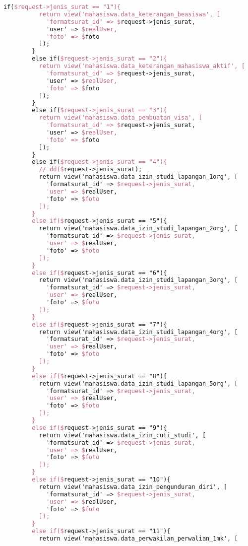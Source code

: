\begin{lstlisting}[language=tex,basicstyle=\tiny,caption=FormatsuratController.php]
        if($request->jenis_surat == "1"){
          return view('mahasiswa.data_keterangan_beasiswa', [
            'formatsurat_id' => $request->jenis_surat,
            'user' => $realUser,
            'foto' => $foto
          ]);
        }
        else if($request->jenis_surat == "2"){
          return view('mahasiswa.data_keterangan_mahasiswa_aktif', [
            'formatsurat_id' => $request->jenis_surat,
            'user' => $realUser,
            'foto' => $foto
          ]);
        }
        else if($request->jenis_surat == "3"){
          return view('mahasiswa.data_pembuatan_visa', [
            'formatsurat_id' => $request->jenis_surat,
            'user' => $realUser,
            'foto' => $foto
          ]);
        }
        else if($request->jenis_surat == "4"){
          // dd($request->jenis_surat);
          return view('mahasiswa.data_izin_studi_lapangan_1org', [
            'formatsurat_id' => $request->jenis_surat,
            'user' => $realUser,
            'foto' => $foto
          ]);
        }
        else if($request->jenis_surat == "5"){
          return view('mahasiswa.data_izin_studi_lapangan_2org', [
            'formatsurat_id' => $request->jenis_surat,
            'user' => $realUser,
            'foto' => $foto
          ]);
        }
        else if($request->jenis_surat == "6"){
          return view('mahasiswa.data_izin_studi_lapangan_3org', [
            'formatsurat_id' => $request->jenis_surat,
            'user' => $realUser,
            'foto' => $foto
          ]);
        }
        else if($request->jenis_surat == "7"){
          return view('mahasiswa.data_izin_studi_lapangan_4org', [
            'formatsurat_id' => $request->jenis_surat,
            'user' => $realUser,
            'foto' => $foto
          ]);
        }
        else if($request->jenis_surat == "8"){
          return view('mahasiswa.data_izin_studi_lapangan_5org', [
            'formatsurat_id' => $request->jenis_surat,
            'user' => $realUser,
            'foto' => $foto
          ]);
        }
        else if($request->jenis_surat == "9"){
          return view('mahasiswa.data_izin_cuti_studi', [
            'formatsurat_id' => $request->jenis_surat,
            'user' => $realUser,
            'foto' => $foto
          ]);
        }
        else if($request->jenis_surat == "10"){
          return view('mahasiswa.data_izin_pengunduran_diri', [
            'formatsurat_id' => $request->jenis_surat,
            'user' => $realUser,
            'foto' => $foto
          ]);
        }
        else if($request->jenis_surat == "11"){
          return view('mahasiswa.data_perwakilan_perwalian_1mk', [

\end{lstlisting}
